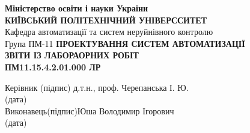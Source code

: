 \documentclass[a4paper]{article}
\begin{document}
\thispagestyle{empty}
\centering
\textbf{Міністерство освіти і науки України}\\
\textbf{КИЇВСЬКИЙ ПОЛІТЕХНІЧНИЙ УНІВЕРССИТЕТ}\\[2cm]
\raggedleft
Кафедра автоматизації та систем неруйнівного контролю\\
Група ПМ-11
\vfill
\centering
\textbf{ПРОЕКТУВАННЯ СИСТЕМ АВТОМАТИЗАЦІЇ}\\[1cm]
\textbf{ЗВІТИ ІЗ ЛАБОРАОРНИХ РОБІТ}\\[1cm]
\textbf{ПМ11.15.4.2.01.000 ЛР}
\vfill
\begin{flushleft}
    Керівник  \qquad\qquad\quad \hfill\qquad (підпис)\hfill 
    д.т.н., проф. Черепанська І. Ю.\\
    \hfill (дата)\\[2cm]
    Виконавець\hfill (підпис)\hfill Юша Володимир Ігорович\\
    \hfill (дата)
\end{flushleft}
\vfill
{}
\newpage


\end{document}
